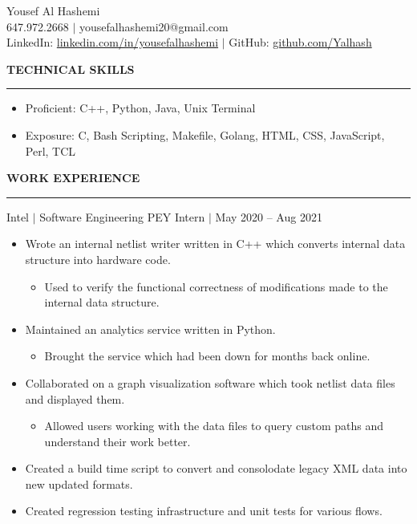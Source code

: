 \documentclass[12pt]{article}
\newcommand{\sectionRule}{\textcolor{gray}{\rule{7.27in}{0.02cm}}}
\newcommand{\sectionTxt}[1]{\noindent\textbf{#1}\\}
\newcommand{\textDate}[3]{\noindent#1 $|$ #2 $|$ {\color{textGray} #3}}
\begin{document}
    \begin{center}
        {\huge Yousef Al Hashemi}\\
        {\normalsize 647.972.2668 $|$ yousefalhashemi20@gmail.com}\\
        {\normalsize LinkedIn: \href{https://www.linkedin.com/in/yousefalhashemi}{linkedin.com/in/yousefalhashemi} $|$ GitHub: \href{https://github.com/Yalhash}{github.com/Yalhash}}\\
    \end{center}
    \sectionTxt{TECHNICAL SKILLS}
    \sectionRule
    \begin{small}
        \begin{itemize}
            \item Proficient: {\color{textGray}C++, Python, Java, Unix Terminal}
            \item Exposure: {\color{textGray}C, Bash Scripting, Makefile, Golang, HTML, CSS, JavaScript, Perl, TCL}
        \end{itemize}
    \end{small}
    \sectionTxt{WORK EXPERIENCE}
    \sectionRule


    \textDate{Intel}{Software Engineering PEY Intern}{May 2020 -- Aug 2021}
    \begin{small}
        \begin{itemize}
            \item {\color{textGray} Wrote an internal netlist writer written in C++ which converts internal data structure into hardware code.}
                \begin{itemize}[label=$\circ$]
                    \item {\color{textGray} Used to verify the functional correctness of modifications made to the internal data structure.}
                \end{itemize}
            \item {\color{textGray} Maintained an analytics service written in Python.}
                \begin{itemize}[label=$\circ$]
                    \item {\color{textGray} Brought the service which had been down for months back online.}
                \end{itemize}
            \item {\color{textGray} Collaborated on a graph visualization software which took netlist data files and displayed them.}
                \begin{itemize}[label=$\circ$]
                    \item {\color{textGray} Allowed users working with the data files to query custom paths and understand their work better.}
                \end{itemize}
            \item {\color{textGray} Created a build time script to convert and consolodate legacy XML data into new updated formats.}
            \item {\color{textGray} Created regression testing infrastructure and unit tests for various flows.}
        \end{itemize}
    \end{small}
\end{document}
